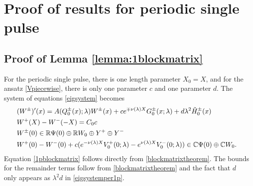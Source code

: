 \documentclass[12pt]{elsarticle}
\theoremstyle{plain}
\theoremstyle{definition}
\theoremstyle{remark}
\numberwithin{theorem}{section}
\numberwithin{equation}{section}
\begin{document}
\section{Proof of results for periodic single pulse }\label{sec:singlepulse}

\subsection{Proof of Lemma \ref{lemma:1blockmatrix} }

For the periodic single pulse, there is one length parameter $X_0 = X$, and for the ansatz \cref{Vpiecewise}, there is only one parameter $c$ and one parameter $d$. The system of equations \cref{eigsystem} becomes
\begin{equation}\label{eigsystemper1p}
\begin{aligned}
&(W^\pm)'(x) = A(Q_0^\pm(x); \lambda) W^\pm(x) + c e^{\mp \nu(\lambda) X} G_0^\pm(x; \lambda) + d \lambda^2 \tilde{H}_0^\pm(x)  \\
&W^+(X) - W^-(-X) = C_0 c \\
&W^\pm(0) \in \mathbb{R} \Psi(0) \oplus \mathbb{R} W_0 \oplus Y^+ \oplus Y^- \\
&W^+(0) - W^-(0) + c ( e^{-\nu(\lambda)X}V_0^+(0; \lambda) - e^{\nu(\lambda)X} V_0^-(0; \lambda)) \in \mathbb{C} \Psi(0) \oplus \mathbb{C} W_0.
\end{aligned}
\end{equation}
Equation \cref{1pblockmatrix} follows directly from \cref{blockmatrixtheorem}. The bounds for the remainder terms follow from \cref{blockmatrixtheorem} and the fact that $d$ only appears as $\lambda^2 d$ in \cref{eigsystemper1p}. 
\end{document}
